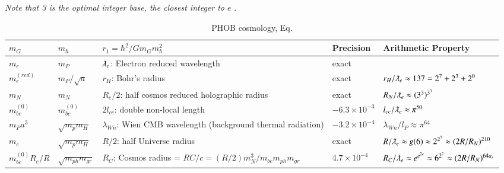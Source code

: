 \documentclass[a4paper,9pt]{article}
\newcounter{col}
\begin{document}
\textit{Note that 3 is the optimal integer base, the closest integer to $e$} \cite{Hayes}.

 

 

 
\begin{table}
\caption[Table \ref{tab:5:table5}: PHOB Cosmology.]{PHOB cosmology, Eq. \label{Eq9}}
\label{tab:5:table5}
  \hskip-2.0cm\begin{tabular}{lllll}
    \toprule
    \cmidrule(r){1-4}
    $m_G$ & $m_{\hbar}$    & $r_1 = \hbar^2/Gm_G m_{\hbar}^2$  & Precision &Arithmetic Property \\
    \midrule
    
    $m_e$ & $m_P $ & $\lambdabar_e$: Electron reduced wavelength   & exact & \\
    
    $m_e^{(red)}$ & $m_P/\sqrt a $ & $r_H$: Bohr's radius   & exact & $ r_H/\lambdabar_e \approx 137 = 2^7+2^3+2^0 $\\
    
    $m_N $ & $m_N$   & $R_e/2$: half cosmos reduced holographic radius  &  exact & $R_N/\lambdabar_e \approx (3^3)^{3^3}$ \\
    $m_{bc}^{(0)} $ & $m_{bc}^{(0)}$   & $2l_{cc}$: double non-local length & $-6.3 \times 10^{-3}$ & $ l_{cc}/\lambdabar_e \approx \pi^{50}$  \\
    $m_Pa^3 $ & $\sqrt {m_pm_H}$  &$\lambda_{Wn}$: Wien CMB wavelength (background thermal radiation) & $-3.2 \times 10^{-4}$ &$\lambda_{Wn}/l_P \approx \pi^{64}$\\
    $m_e $ & $\sqrt {m_pm_H}$   & $R/2$: half Universe radius &exact& $R/\lambdabar_e \approx g(6) \approx 2^{2^7}\approx (2R/R_N)^{210}$   \\
    
    $m_{bc}^{(0)}R_e/R $ & $\sqrt{ m_{ph}m_{gr}}$   & $R_C$: Cosmos radius = $RC/c = (R/2)m_N^3/m_{bc}m_{ph}m_{gr}$ & $4.7 \times 10^{-4} $& $ R_C/\lambdabar_e \approx e^{e^{2e}} \approx 6^{2^7}\approx (2R/R_N)^{64a_s}  $\\
    
  
         
   \bottomrule
  \end{tabular}
\end{table}
\end{document}
